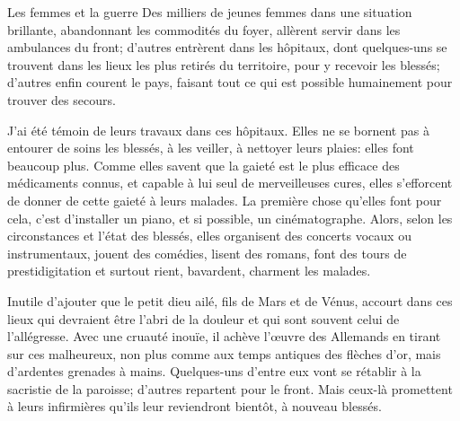 \begin{chapter}{Les femmes et la guerre}
Des milliers de jeunes femmes dans une situation brillante, abandonnant
les commodités du foyer, allèrent servir dans les ambulances du front;
d'autres entrèrent dans les hôpitaux, dont quelques-uns se trouvent dans
les lieux les plus retirés du territoire, pour y recevoir les blessés;
d'autres enfin courent le pays, faisant tout ce qui est possible
humainement pour trouver des secours.

J'ai été témoin de leurs travaux dans ces hôpitaux. Elles ne se bornent
pas à entourer de soins les blessés, à les veiller, à nettoyer leurs
plaies: elles font beaucoup plus. Comme elles savent que la gaieté est
le plus efficace des médicaments connus, et capable à lui seul de
merveilleuses cures, elles s'efforcent de donner de cette gaieté à leurs
malades. La première chose qu'elles font pour cela, c'est d'installer
un piano, et si possible, un cinématographe. Alors, selon les
circonstances et l'état des blessés, elles organisent des concerts
vocaux ou instrumentaux, jouent des comédies, lisent des romans, font
des tours de prestidigitation et surtout rient, bavardent, charment les
malades.

Inutile d'ajouter que le petit dieu ailé, fils de Mars et de Vénus,
accourt dans ces lieux qui devraient être l'abri de la douleur et qui
sont souvent celui de l'allégresse. Avec une cruauté inouïe, il achève
l'œuvre des Allemands en tirant sur ces malheureux, non plus comme
aux temps antiques des flèches d'or, mais d'ardentes grenades à mains.
Quelques-uns d'entre eux vont se rétablir à la sacristie de la paroisse;
d'autres repartent pour le front. Mais ceux-là promettent à leurs
infirmières qu'ils leur reviendront bientôt, à nouveau blessés.

\end{chapter}


